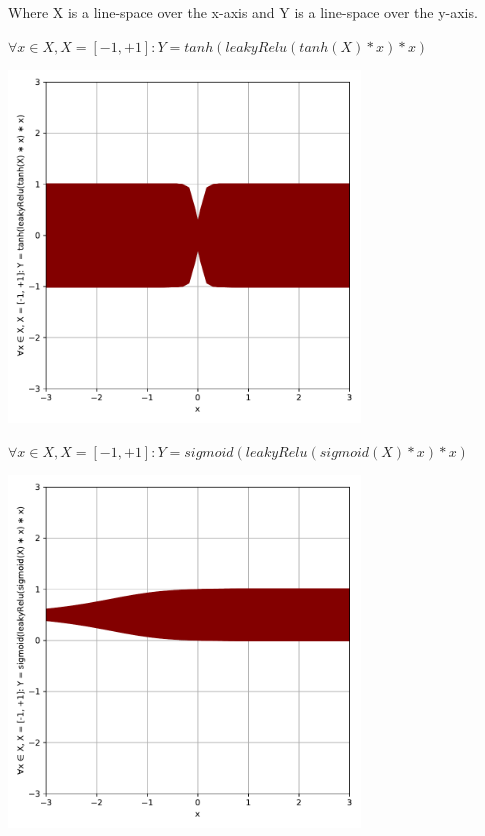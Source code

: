 \documentclass[a4paper, 12pt]{report}
\newcommand\tab[1][1cm]{\hspace*{#1}}
\begin{document}
\tab \tab  Where X is a line-space over the x-axis and Y is a line-space over the y-axis.
\begin{blockfigure} {$ \forall x \in X, X = [-1, +1] : Y = tanh(leakyRelu(tanh(X) * x) * x ) $}
	\begin{center}
		\includegraphics[width = 0.7\textwidth]{tanh_leakyRelu_tanh}
	\end{center}
\end{blockfigure}
\begin{blockfigure}{$ \forall x \in X, X = [-1, +1] : Y = sigmoid(leakyRelu(sigmoid(X) * x) * x) $}
	\begin{center}
		\includegraphics[width = 0.7\textwidth]{sigmoid_leakyRelu_sigmoid}
	\end{center}
\end{blockfigure}
\newpage
\end{document}
